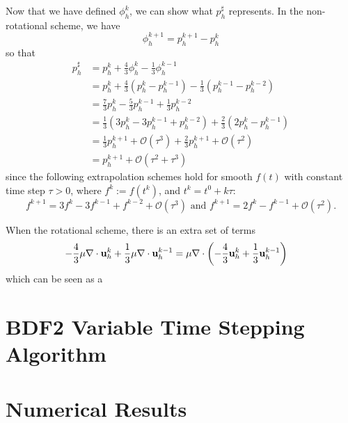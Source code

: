 \documentclass[letterpaper]{erdc}
\begin{document}
\begin{remark}
Now that we have defined $\phi_h^{k}$, we can show what $p_h^{\sharp}$ represents.  In the non-rotational scheme, we have
\begin{equation}
  \phi_h^{k+1} = p_h^{k+1} - p_h^{k}
\end{equation}
so that
  \begin{align}
    p_h^{\sharp} &= p_h^{k} + \frac{4}{3}\phi_h^{k} - \frac{1}{3}\phi_h^{k-1}\\
    &= p_h^{k} + \frac{4}{3}\left(p_h^{k} - p_h^{k-1}\right) - \frac{1}{3}\left(p_h^{k-1} - p_h^{k-2}\right)\\
    &= \frac{7}{3}p_h^{k} - \frac{5}{3}p_h^{k-1}+ \frac{1}{3}p_h^{k-2} \\
    &= \frac{1}{3}\left( 3p_h^{k} - 3p_h^{k-1} + p_h^{k-2} \right) + \frac{2}{3}\left(2p_h^{k} - p_h^{k-1}  \right)\\
    &= \frac{1}{3}p_h^{k+1} + \mathcal{O}(\tau^{3}) + \frac{2}{3} p_h^{k+1} + \mathcal{O}(\tau^{2})\\
    &= p_h^{k+1} + \mathcal{O}\left(\tau^2+\tau^3\right)
  \end{align}
  since the following extrapolation schemes hold for smooth $f(t)$ with constant time step $\tau>0$, where $f^{k} := f\left(t^{k}\right)$, and $t^k = t^0+k\tau$:
  \begin{equation}
    f^{k+1} = 3f^k - 3f^{k-1}+f^{k-2} + \mathcal{O}(\tau^3) \mbox{ and } f^{k+1}=2f^{k} - f^{k-1}+\mathcal{O}(\tau^2).
  \end{equation}
  
  When the rotational scheme, there is an extra set of terms
  \begin{align}
    -\frac{4}{3}\mu\nabla\cdot\textbf{u}_h^{k} + \frac{1}{3}\mu\nabla\cdot\textbf{u}_h^{k-1} &= \mu\nabla\cdot\left( -\frac{4}{3}\textbf{u}_h^{k} + \frac{1}{3}\textbf{u}_h^{k-1} \right) 
  \end{align}
  which can be seen as a 
\end{remark}

%
%
%
\section{BDF2 Variable Time Stepping Algorithm}\label{sec:BDF2VariableTimeSteppingAlgorithm}


%
%
%
\section{Numerical Results}\label{sec:NumericalResults}
\end{document}
